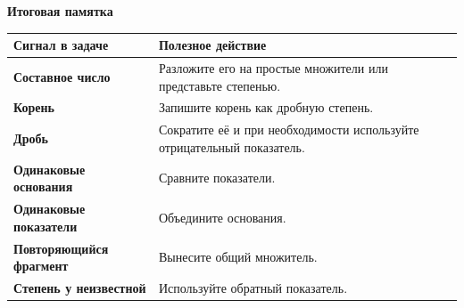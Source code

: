 \documentclass[a4paper,12pt]{article}
\begin{document}
\begin{center}
{\color{darkaccent}\bfseries Итоговая памятка}

\vspace{3mm}

\begin{tabularx}{0.92\linewidth}{@{}>{\bfseries}p{39mm}X@{}}
\toprule
Сигнал в задаче & Полезное действие \\
\midrule
Составное число & Разложите его на простые множители или представьте степенью. \\

Корень & Запишите корень как дробную степень. \\

Дробь & Сократите её и при необходимости используйте отрицательный показатель. \\

Одинаковые основания & Сравните показатели. \\

Одинаковые показатели & Объедините основания. \\

Повторяющийся фрагмент & Вынесите общий множитель. \\

Степень у неизвестной & Используйте обратный показатель. \\
\bottomrule
\end{tabularx}
\end{center}
\end{document}
